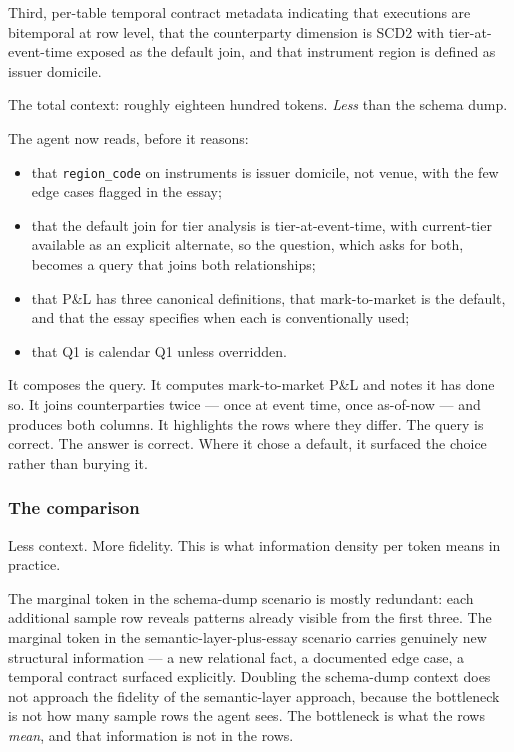 \documentclass[11pt,a4paper]{article}
\begin{document}
Third, per-table temporal contract metadata indicating that executions are bitemporal at row level, that the counterparty dimension is SCD2 with tier-at-event-time exposed as the default join, and that instrument region is defined as issuer domicile.

The total context: roughly eighteen hundred tokens. \emph{Less} than the schema dump.

The agent now reads, before it reasons:

\begin{itemize}[leftmargin=*, itemsep=2pt]
  \item that \texttt{region\_code} on instruments is issuer domicile, not venue, with the few edge cases flagged in the essay;
  \item that the default join for tier analysis is tier-at-event-time, with current-tier available as an explicit alternate, so the question, which asks for both, becomes a query that joins both relationships;
  \item that P\&L has three canonical definitions, that mark-to-market is the default, and that the essay specifies when each is conventionally used;
  \item that Q1 is calendar Q1 unless overridden.
\end{itemize}

It composes the query. It computes mark-to-market P\&L and notes it has done so. It joins counterparties twice --- once at event time, once as-of-now --- and produces both columns. It highlights the rows where they differ. The query is correct. The answer is correct. Where it chose a default, it surfaced the choice rather than burying it.

\subsubsection{The comparison}

Less context. More fidelity. This is what information density per token means in practice.

The marginal token in the schema-dump scenario is mostly redundant: each additional sample row reveals patterns already visible from the first three. The marginal token in the semantic-layer-plus-essay scenario carries genuinely new structural information --- a new relational fact, a documented edge case, a temporal contract surfaced explicitly. Doubling the schema-dump context does not approach the fidelity of the semantic-layer approach, because the bottleneck is not how many sample rows the agent sees. The bottleneck is what the rows \emph{mean}, and that information is not in the rows.
\end{document}
